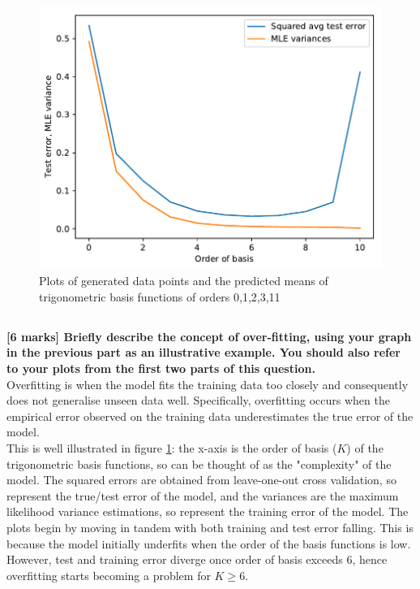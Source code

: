 \documentclass[12pt,twoside]{article}
\begin{document}
\begin{figure}[h]
\centering %
\includegraphics[width = 0.9\hsize] {./figures/sq_error_variance.pdf}
\caption{Plots of generated data points and the predicted means of trigonometric basis functions of orders 0,1,2,3,11}%
\label{fig:error}
\end{figure}

\newpage

\subsection{}
\textbf{[6 marks] Briefly describe the concept of over-fitting, using your graph in the previous part as an illustrative example. You should also refer to your plots from the first two parts of this question.}\\

Overfitting is when the model fits the training data too closely and consequently does not generalise unseen data well. Specifically, overfitting occurs when the empirical error observed on the training data underestimates the true error of the model. \\

This is well illustrated in figure \ref{fig:error}:
the x-axis is the order of basis ($K$) of the trigonometric basis functions, so can be thought of as the "complexity" of the model. The squared errors are obtained from leave-one-out cross validation, so represent the true/test error of the model, and the variances are the maximum likelihood variance estimations, so represent the training error of the model. The plots begin by moving in tandem with both training and test error falling. This is because the model initially underfits when the order of the basis functions is low. However, test and training error diverge once order of basis exceeds 6, hence overfitting starts becoming a problem for $K \geq 6$. \\
\end{document}
